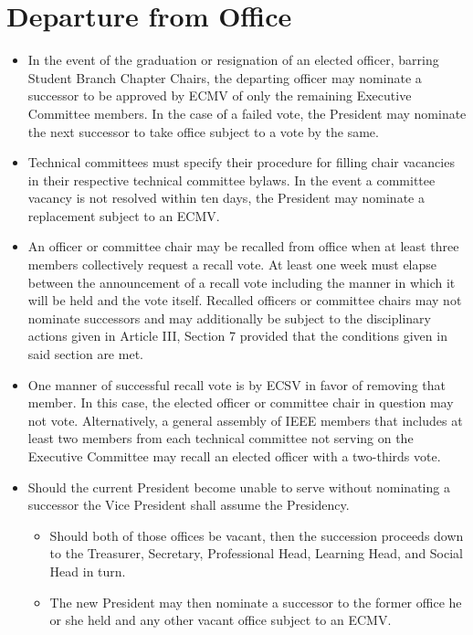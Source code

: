 \documentclass[12pt]{constitution}
\begin{document}
\section{Departure from Office}
\label{sec:exec_depart}
\begin{itemize}
    \item In the event of the graduation or resignation of an elected officer, barring Student Branch Chapter Chairs, the departing officer may nominate a successor to be approved by ECMV of only the remaining Executive Committee members. In the case of a failed vote, the President may nominate the next successor to take office subject to a vote by the same.
    \item Technical committees must specify their procedure for filling chair vacancies in their respective technical committee bylaws. In the event a committee vacancy is not resolved within ten days, the President may nominate a replacement subject to an ECMV.
    \item An officer or committee chair may be recalled from office when at least three members collectively request a recall vote. At least one week must elapse between the announcement of a recall vote including the manner in which it will be held and the vote itself. Recalled officers or committee chairs may not nominate successors and may additionally be subject to the disciplinary actions given in Article III, Section 7 provided that the conditions given in said section are met.
    \item One manner of successful recall vote is by ECSV in favor of removing that member. In this case, the elected officer or committee chair in question may not vote. Alternatively, a general assembly of IEEE members that includes at least two members from each technical committee not serving on the Executive Committee may recall an elected officer with a two-thirds vote.
    \item Should the current President become unable to serve without nominating a successor the Vice President shall assume the Presidency.
    \begin{itemize}
        \item Should both of those offices be vacant, then the succession proceeds down to the Treasurer, Secretary, Professional Head, Learning Head, and Social Head in turn.
        \item The new President may then nominate a successor to the former office he or she held and any other vacant office subject to an ECMV.
    \end{itemize}
\end{itemize}
\end{document}
